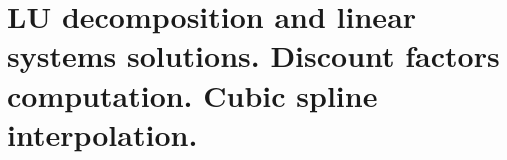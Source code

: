 \chapter[LU decomposition]{LU decomposition and linear systems solutions. Discount factors computation. Cubic spline interpolation.}
\label{ch:02}



















